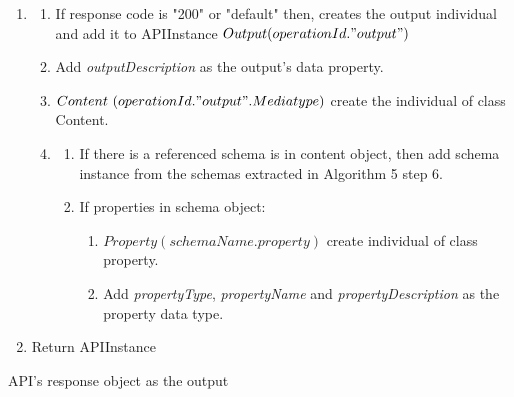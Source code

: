\setlength{\algomargin}{2em} %
\begin{algorithm}
	\DontPrintSemicolon
	\begin{enumerate}
		\item 
			{
				\begin{enumerate}
				  \def\labelenumii{\alph{enumii}.}
				  \item
				    If response code is "200" or "default" then, creates the output
				    individual and add it to APIInstance
				    \(Output(operationId."output")\)
				  \item
				    Add \emph{outputDescription} as the output's data property.
				  \item
				    \(Content\ (operationId."output".Mediatype)\) create the individual
				    of class Content.
				  \item
				    {
				    	 \begin{enumerate}
				    					    \def\labelenumiii{\roman{enumiii}.}
				    					    \item
				    					      If there is a referenced schema is in content object, then add
				    					      schema instance from the schemas extracted in Algorithm 5 step 6.
				    					    \item
				    					      If properties in schema object:
				    					
				    					      \begin{enumerate}
				    					      \def\labelenumiv{\arabic{enumiv}.}
				    					      \item
				    					        \(Property(schemaName.property)\) create individual of class
				    					        property.
				    					      \item
				    					        Add \emph{propertyType}, \emph{propertyName} and
				    					        \emph{propertyDescription} as the property data type.
				    					      \end{enumerate}
				    					    \end{enumerate}
				    }\label{endfor}		   
				  \end{enumerate}
			
			}\label{endfor}
	\item 
	Return APIInstance
		
\end{enumerate}
	
	
	\caption{API’s response object as the output}\label{alg:api-instance-response}
\end{algorithm}


